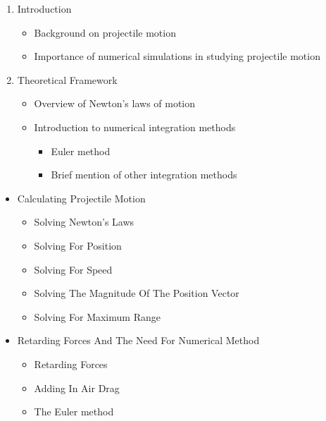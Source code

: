 \documentclass[11pt]{article}
\providecommand{\tightlist}{%
      \setlength{\itemsep}{0pt}\setlength{\parskip}{0pt}}
\begin{document}
\begin{enumerate}
\def\labelenumi{\arabic{enumi}.}
\item
  Introduction

  \begin{itemize}
  \tightlist
  \item
    Background on projectile motion
  \item
    Importance of numerical simulations in studying projectile motion
  \end{itemize}
\item
  Theoretical Framework

  \begin{itemize}
  \tightlist
  \item
    Overview of Newton's laws of motion
  \item
    Introduction to numerical integration methods

    \begin{itemize}
    \tightlist
    \item
      Euler method
    \item
      Brief mention of other integration methods
    \end{itemize}
  \end{itemize}
\end{enumerate}

\begin{itemize}
\tightlist
\item
  Calculating Projectile Motion

  \begin{itemize}
  \tightlist
  \item
    Solving Newton's Laws
  \item
    Solving For Position
  \item
    Solving For Speed
  \item
    Solving The Magnitude Of The Position Vector
  \item
    Solving For Maximum Range
  \end{itemize}
\item
  Retarding Forces And The Need For Numerical Method

  \begin{itemize}
  \tightlist
  \item
    Retarding Forces
  \item
    Adding In Air Drag
  \item
    The Euler method
  \end{itemize}
\end{itemize}
\end{document}
